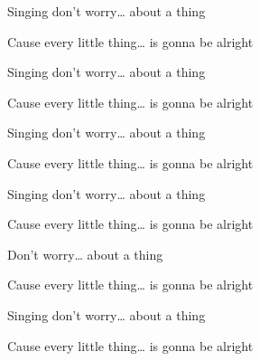 \begin{song}
\bigskip

Singing don't worry… about a thing \par
Cause every little thing… is gonna be alright \par
Singing don't worry… about a thing \par
Cause every little thing… is gonna be alright \par

\bigskip

Singing don't worry… about a thing \par
Cause every little thing… is gonna be alright \par
Singing don't worry… about a thing \par
Cause every little thing… is gonna be alright \par

\bigskip

Don't worry… about a thing \par
Cause every little thing… is gonna be alright \par
Singing don't worry… about a thing \par
Cause every little thing… is gonna be alright \par

\end{song}